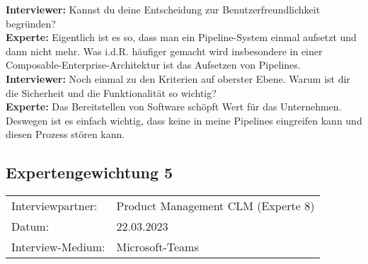 \begin{linenumbers}
    \textbf{Interviewer:} Kannst du deine Entscheidung zur Benutzerfreundlichkeit begründen?\\
    \textbf{Experte:} Eigentlich ist es so, dass man ein Pipeline-System einmal aufsetzt und dann nicht mehr. Was i.d.R. häufiger gemacht wird insbesondere in einer Composable-Enterprise-Architektur ist das Aufsetzen von Pipelines.\\
    \textbf{Interviewer:} Noch einmal zu den Kriterien auf oberster Ebene. Warum ist dir die Sicherheit und die Funktionalität so wichtig?\\
    \textbf{Experte:} Das Bereitstellen von Software schöpft Wert für das Unternehmen. Deswegen ist es einfach wichtig, dass keine in meine Pipelines eingreifen kann und diesen Prozess stören kann.\\
    
\end{linenumbers}


\newpage
\subsection{Expertengewichtung 5}
        \begin{tabular}{ l l }
    Interviewpartner: & Product Management CLM  (Experte 8)\\
    Datum: & 22.03.2023\\
    Interview-Medium: & Microsoft-Teams\\
\end{tabular}
\begin{center}
\begin{figure}[H]
    \centering
    \label{fig:CEA}
\end{figure}	
\end{center}
\begin{center}
\begin{figure}[H]
    \centering
    \label{fig:CEA}
\end{figure}	
\end{center}

